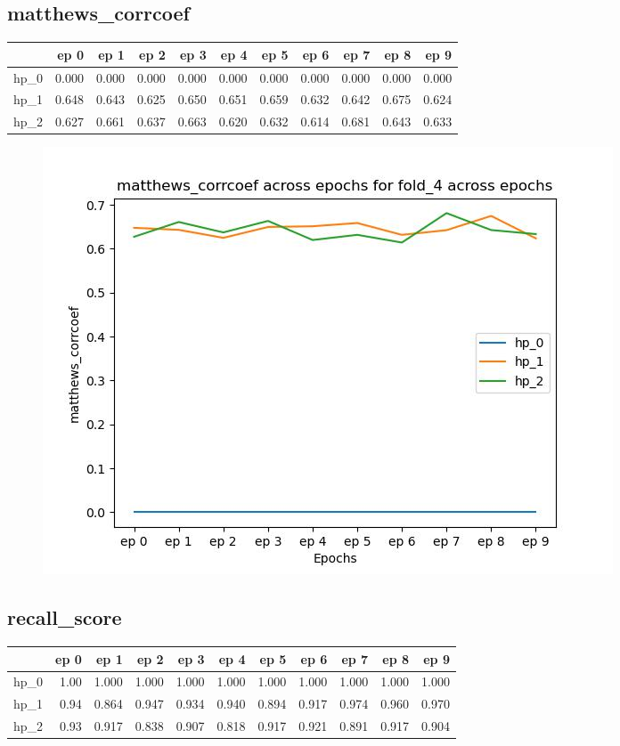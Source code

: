 \documentclass{article}
\begin{document}
\subsection{matthews\_corrcoef}
\begin{tabular}{lrrrrrrrrrr}
\toprule
{} &   ep 0 &   ep 1 &   ep 2 &   ep 3 &   ep 4 &   ep 5 &   ep 6 &   ep 7 &   ep 8 &   ep 9 \\
\midrule
hp\_0 &  0.000 &  0.000 &  0.000 &  0.000 &  0.000 &  0.000 &  0.000 &  0.000 &  0.000 &  0.000 \\
hp\_1 &  0.648 &  0.643 &  0.625 &  0.650 &  0.651 &  0.659 &  0.632 &  0.642 &  0.675 &  0.624 \\
hp\_2 &  0.627 &  0.661 &  0.637 &  0.663 &  0.620 &  0.632 &  0.614 &  0.681 &  0.643 &  0.633 \\
\bottomrule
\end{tabular}

\begin{figure}[H]
\includegraphics[scale = 0.75]{fold_4/matthews_corrcoef}
\end{figure}
\subsection{recall\_score}
\begin{tabular}{lrrrrrrrrrr}
\toprule
{} &  ep 0 &   ep 1 &   ep 2 &   ep 3 &   ep 4 &   ep 5 &   ep 6 &   ep 7 &   ep 8 &   ep 9 \\
\midrule
hp\_0 &  1.00 &  1.000 &  1.000 &  1.000 &  1.000 &  1.000 &  1.000 &  1.000 &  1.000 &  1.000 \\
hp\_1 &  0.94 &  0.864 &  0.947 &  0.934 &  0.940 &  0.894 &  0.917 &  0.974 &  0.960 &  0.970 \\
hp\_2 &  0.93 &  0.917 &  0.838 &  0.907 &  0.818 &  0.917 &  0.921 &  0.891 &  0.917 &  0.904 \\
\bottomrule
\end{tabular}
\end{document}
